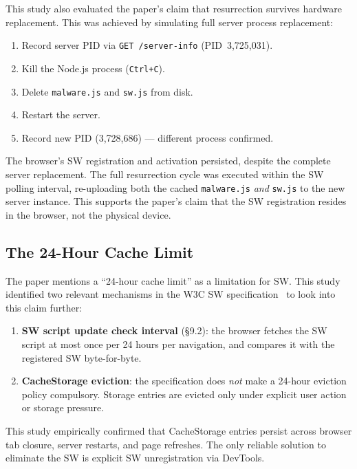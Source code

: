 \documentclass[conference]{IEEEtran}
\begin{document}
This study also evaluated the paper's claim that resurrection survives hardware replacement. This was achieved by simulating full server process replacement:

\begin{enumerate}
  \item Record server PID via \texttt{GET /server-info} (PID~3{,}725{,}031).
  \item Kill the Node.js process (\texttt{Ctrl+C}).
  \item Delete \texttt{malware.js} and \texttt{sw.js} from disk.
  \item Restart the server.
  \item Record new PID (3{,}728{,}686) --- different process confirmed.
\end{enumerate}

The browser's SW registration and activation persisted, despite the complete server replacement. The full resurrection cycle was executed within the SW polling interval, re-uploading both the cached \texttt{malware.js} \emph{and} \texttt{sw.js} to the new server instance. This supports the paper's claim that the SW registration resides in the browser, not the physical device.

\subsection{The 24-Hour Cache Limit}

The paper mentions a ``24-hour cache limit'' as a limitation for SW. This study identified two relevant mechanisms in the W3C SW specification~\cite{w3c-sw} to look into this claim further:

\begin{enumerate}
  \item \textbf{SW script update check interval} (\S9.2): the browser fetches the SW script at most once per 24 hours per navigation, and compares it with the registered SW byte-for-byte. 

  \item \textbf{CacheStorage eviction}: the specification does \emph{not} make a 24-hour eviction policy compulsory. Storage entries are evicted only under explicit user action or storage pressure.
\end{enumerate}

This study empirically confirmed that CacheStorage entries persist across browser tab closure, server restarts, and page refreshes. The only reliable solution to eliminate the SW is explicit SW unregistration via DevTools. 
\end{document}
